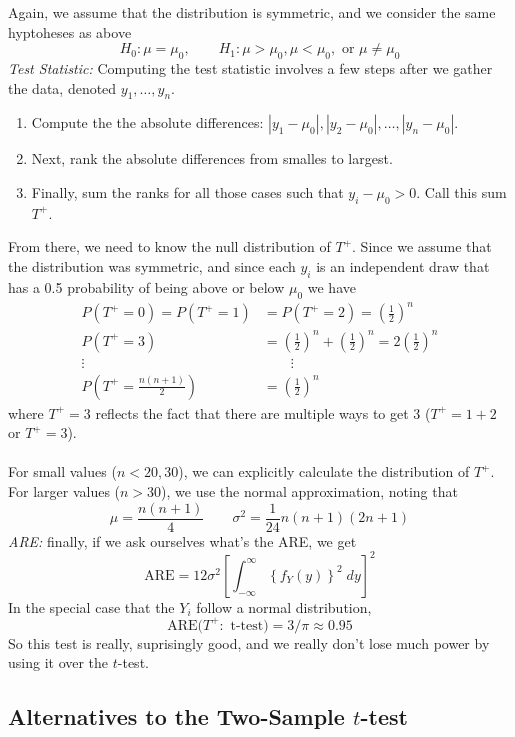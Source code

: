 \documentclass[a4paper,12pt]{scrartcl}
\begin{document}
Again, we assume that the distribution is symmetric, and we consider
the same hyptoheses as above
\[ H_0: \mu = \mu_0, \qquad H_1: \mu>\mu_0, \mu<\mu_0, \text{ or }
      \mu\neq\mu_0\]
{\sl Test Statistic:} Computing the test statistic involves a few steps
after we gather the data, denoted $y_1, \ldots, y_n$. 
\begin{enumerate}
   \item Compute the the absolute differences: 
      $|y_1 - \mu_0|, |y_2 - \mu_0|, \ldots, |y_n - \mu_0|$. 
   \item Next, rank the absolute differences from smalles to largest.
   \item Finally, sum the ranks for all those cases such that
      $y_i - \mu_0 >0$. Call this sum $T^+$.
\end{enumerate}
From there, we need to know the null distribution of $T^+$. Since we 
assume that the distribution was symmetric, and since each
$y_i$ is an independent draw that has a 0.5 probability of being
above or below $\mu_0$ we have 
\begin{align*}
   P(T^+ = 0) = P(T^+ = 1) &= P(T^+ = 2)=\left(\frac{1}{2}\right)^n \\
   P(T^+ = 3) &= \left(\frac{1}{2}\right)^n 
      + \left(\frac{1}{2}\right)^n = 2\left(\frac{1}{2}\right)^n\\
   \vdots \qquad & \qquad \vdots \\
   P\left(T^+ = \frac{n(n+1)}{2}\right) &= \left(\frac{1}{2}\right)^n 
\end{align*}
where $T^+ = 3$ reflects the fact that there are multiple ways
to get 3 ($T^+ = 1 + 2$ or $T^+ = 3$). 
\\
\\
For small values ($n<20,30$), we can explicitly calculate the
distribution of $T^+$. For larger values ($n>30$), we use the
normal approximation, noting that
   \[ \mu = \frac{n(n+1)}{4}\qquad \sigma^2 = \frac{1}{24}n(n+1)(2n+1)
      \]
{\sl ARE:} finally, if we ask ourselves what's the ARE, we get
\[ \text{ARE} = 12 \sigma^2 \left[ \int^\infty_{-\infty} \left\{
   f_Y(y)\right\}^2 \; dy \right]^2\] 
In the special case that the $Y_i$ follow a normal distribution, 
   \[ \text{ARE($T^+:$ t-test)} = 3/\pi \approx 0.95\]
So this test is really, suprisingly good, and we really don't lose
much power by using it over the $t$-test.

\newpage
\subsection{Alternatives to the Two-Sample $t$-test}
\end{document}
